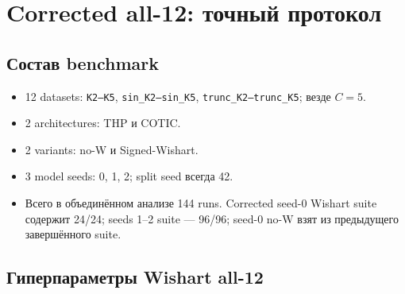 \documentclass[11pt,a4paper]{article}
\newcommand{\code}[1]{\texttt{#1}}
\begin{document}
\section{Corrected all-12: точный протокол}

\subsection{Состав benchmark}

\begin{itemize}
  \item 12 datasets: \code{K2--K5}, \code{sin\_K2--sin\_K5},
  \code{trunc\_K2--trunc\_K5}; везде $C=5$.
  \item 2 architectures: THP и COTIC.
  \item 2 variants: no-W и Signed-Wishart.
  \item 3 model seeds: 0, 1, 2; split seed всегда 42.
  \item Всего в объединённом анализе 144 runs. Corrected seed-0 Wishart suite
  содержит 24/24; seeds 1--2 suite --- 96/96; seed-0 no-W взят из предыдущего
  завершённого suite.
\end{itemize}

\subsection{Гиперпараметры Wishart all-12}
\end{document}
